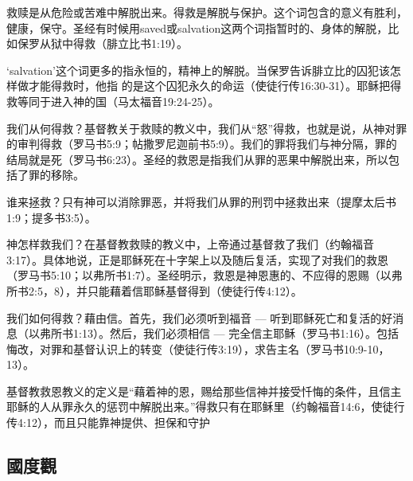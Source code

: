 救赎是从危险或苦难中解脱出来。得救是解脱与保护。这个词包含的意义有胜利，健康，保守。圣经有时候用saved或salvation这两个词指暂时的、身体的解脱，比如保罗从狱中得救（腓立比书1:19）。

‘salvation’这个词更多的指永恒的，精神上的解脱。当保罗告诉腓立比的囚犯该怎样做才能得救时，他指 的是这个囚犯永久的命运（使徒行传16:30-31）。耶稣把得救等同于进入神的国（马太福音19:24-25）。

我们从何得救？基督教关于救赎的教义中，我们从“怒”得救，也就是说，从神对罪的审判得救（罗马书5:9；帖撒罗尼迦前书5:9）。我们的罪将我们与神分隔，罪的结局就是死（罗马书6:23）。圣经的救恩是指我们从罪的恶果中解脱出来，所以包括了罪的移除。

谁来拯救？只有神可以消除罪恶，并将我们从罪的刑罚中拯救出来（提摩太后书1:9；提多书3:5）。

神怎样救我们？在基督教救赎的教义中，上帝通过基督救了我们（约翰福音3:17）。具体地说，正是耶稣死在十字架上以及随后复活，实现了对我们的救恩（罗马书5:10；以弗所书1:7）。圣经明示，救恩是神恩惠的、不应得的恩赐（以弗所书2:5，8），并只能藉着信耶稣基督得到（使徒行传4:12）。

我们如何得救？藉由信。首先，我们必须听到福音 — 听到耶稣死亡和复活的好消息（以弗所书1:13）。然后，我们必须相信 — 完全信主耶稣（罗马书1:16）。包括悔改，对罪和基督认识上的转变（使徒行传3:19），求告主名（罗马书10:9-10，13）。

基督教救恩教义的定义是“藉着神的恩，赐给那些信神并接受忏悔的条件，且信主耶稣的人从罪永久的惩罚中解脱出来。”得救只有在耶稣里（约翰福音14:6，使徒行传4:12），而且只能靠神提供、担保和守护



\subsection{國度觀}

